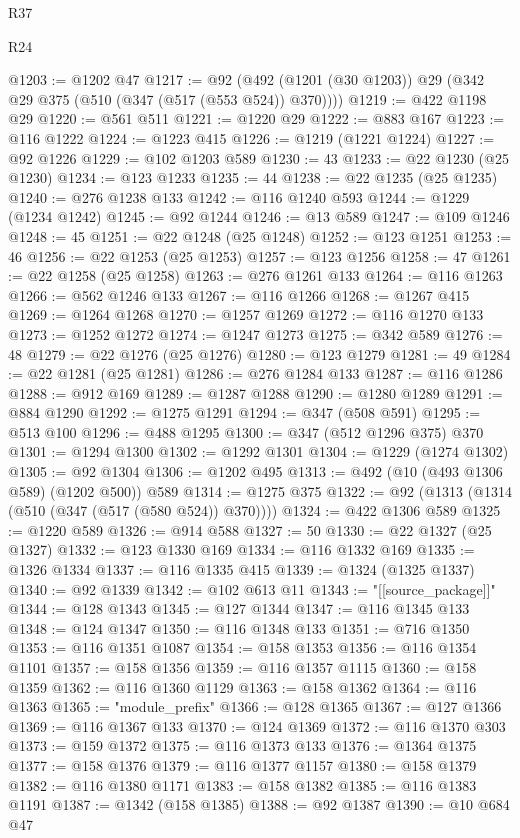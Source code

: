 \begin{lexlean}{R37}
\begin{lexlean}{R24}
\begin{coremodule}
{{{{{{{{{{{{{{{{{{{{{{{{{{{{{{{{{{{{{{{{{{{{{{{{{{{{{{{{{{{{{{{{{{{{{{{{{{{{{{{{{{{{{{{{{{{{{{{{{{{{{{{{{{{{{{{{{{{{{{{{{{{{{{{{{{{{{{{{{{{{{{{{{{{{{{{{{{{{{{{{{{{{{{{{{{{{{{{{{{{{{{{{{@1203 := @1202 @47
@1217 := @92 (@492 (@1201 (@30 @1203)) @29 (@342 @29 @375 (@510 (@347 (@517 (@553 @524)) @370))))
@1219 := @422 @1198 @29
@1220 := @561 @511
@1221 := @1220 @29
@1222 := @883 @167
@1223 := @116 @1222
@1224 := @1223 @415
@1226 := @1219 (@1221 @1224)
@1227 := @92 @1226
@1229 := @102 @1203 @589
@1230 := 43
@1233 := @22 @1230 (@25 @1230)
@1234 := @123 @1233
@1235 := 44
@1238 := @22 @1235 (@25 @1235)
@1240 := @276 @1238 @133
@1242 := @116 @1240 @593
@1244 := @1229 (@1234 @1242)
@1245 := @92 @1244
@1246 := @13 @589
@1247 := @109 @1246
@1248 := 45
@1251 := @22 @1248 (@25 @1248)
@1252 := @123 @1251
@1253 := 46
@1256 := @22 @1253 (@25 @1253)
@1257 := @123 @1256
@1258 := 47
@1261 := @22 @1258 (@25 @1258)
@1263 := @276 @1261 @133
@1264 := @116 @1263
@1266 := @562 @1246 @133
@1267 := @116 @1266
@1268 := @1267 @415
@1269 := @1264 @1268
@1270 := @1257 @1269
@1272 := @116 @1270 @133
@1273 := @1252 @1272
@1274 := @1247 @1273
@1275 := @342 @589
@1276 := 48
@1279 := @22 @1276 (@25 @1276)
@1280 := @123 @1279
@1281 := 49
@1284 := @22 @1281 (@25 @1281)
@1286 := @276 @1284 @133
@1287 := @116 @1286
@1288 := @912 @169
@1289 := @1287 @1288
@1290 := @1280 @1289
@1291 := @884 @1290
@1292 := @1275 @1291
@1294 := @347 (@508 @591)
@1295 := @513 @100
@1296 := @488 @1295
@1300 := @347 (@512 @1296 @375) @370
@1301 := @1294 @1300
@1302 := @1292 @1301
@1304 := @1229 (@1274 @1302)
@1305 := @92 @1304
@1306 := @1202 @495
@1313 := @492 (@10 (@493 @1306 @589) (@1202 @500)) @589
@1314 := @1275 @375
@1322 := @92 (@1313 (@1314 (@510 (@347 (@517 (@580 @524)) @370))))
@1324 := @422 @1306 @589
@1325 := @1220 @589
@1326 := @914 @588
@1327 := 50
@1330 := @22 @1327 (@25 @1327)
@1332 := @123 @1330 @169
@1334 := @116 @1332 @169
@1335 := @1326 @1334
@1337 := @116 @1335 @415
@1339 := @1324 (@1325 @1337)
@1340 := @92 @1339
@1342 := @102 @613 @11
@1343 := "[[source_package]]"
@1344 := @128 @1343
@1345 := @127 @1344
@1347 := @116 @1345 @133
@1348 := @124 @1347
@1350 := @116 @1348 @133
@1351 := @716 @1350
@1353 := @116 @1351 @1087
@1354 := @158 @1353
@1356 := @116 @1354 @1101
@1357 := @158 @1356
@1359 := @116 @1357 @1115
@1360 := @158 @1359
@1362 := @116 @1360 @1129
@1363 := @158 @1362
@1364 := @116 @1363
@1365 := "module_prefix"
@1366 := @128 @1365
@1367 := @127 @1366
@1369 := @116 @1367 @133
@1370 := @124 @1369
@1372 := @116 @1370 @303
@1373 := @159 @1372
@1375 := @116 @1373 @133
@1376 := @1364 @1375
@1377 := @158 @1376
@1379 := @116 @1377 @1157
@1380 := @158 @1379
@1382 := @116 @1380 @1171
@1383 := @158 @1382
@1385 := @116 @1383 @1191
@1387 := @1342 (@158 @1385)
@1388 := @92 @1387
@1390 := @10 @684 @47
}}}}}}}}}}}}}}}}}}}}}}}}}}}}}}}}}}}}}}}}}}}}}}}}}}}}}}}}}}}}}}}}}}}}}}}}}}}}}}}}}}}}}}}}}}}}}}}}}}}}}}}}}}}}}}}}}}}}}}}}}}}}}}}}}}}}}}}}}}}}}}}}}}}}}}}}}}}}}}}}}}}}}}}}}}}}}}}}}}}}}}}}}
\end{coremodule}
\end{lexlean}
\end{lexlean}
